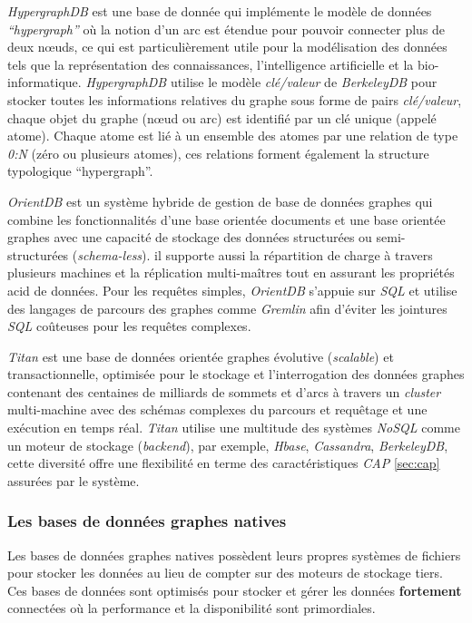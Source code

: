 \begin{itemize}
    \emph{HypergraphDB} \cite{hypergraphdb, iordanov2010hypergraphdb}
    est une base de donnée qui implémente le modèle de données
    \emph{``hypergraph''} où la notion d'un arc est étendue pour
    pouvoir connecter plus de deux nœuds, ce qui est particulièrement
    utile pour la modélisation des données tels que la représentation
    des connaissances, l'intelligence artificielle et la
    bio-informatique. \emph{HypergraphDB} utilise le modèle
    \textit{clé/valeur} de \emph{BerkeleyDB} \cite{berkeleydb} pour
    stocker toutes les informations relatives du graphe sous forme de
    pairs \textit{clé/valeur}, chaque objet du graphe (nœud ou arc)
    est identifié par un clé unique (appelé atome). Chaque atome est
    lié à un ensemble des atomes par une relation de type \emph{0:N}
    (zéro ou plusieurs atomes), ces relations forment également la
    structure typologique ``hypergraph''.

    \emph{OrientDB} \cite{orientdb} est un système hybride de gestion
    de base de données graphes qui combine les fonctionnalités d'une
    base orientée documents et une base orientée graphes avec une
    capacité de stockage des données structurées ou semi-structurées
    (\emph{schema-less}). il supporte aussi la répartition de charge à
    travers plusieurs machines et la réplication multi-maîtres tout en
    assurant les propriétés \acrshort{acid} de données. Pour les
    requêtes simples, \emph{OrientDB} s'appuie sur \emph{SQL} et
    utilise des langages de parcours des graphes comme \emph{Gremlin}
    afin d'éviter les jointures \emph{SQL} coûteuses pour les requêtes
    complexes.

    \emph{Titan} \cite{titan} est une base de données orientée graphes
    évolutive (\emph{scalable}) et transactionnelle, optimisée pour le
    stockage et l'interrogation des données graphes contenant des
    centaines de milliards de sommets et d'arcs à travers un
    \emph{cluster} multi-machine avec des schémas complexes du
    parcours et requêtage et une exécution en temps réal. \emph{Titan}
    utilise une multitude des systèmes \emph{NoSQL} comme un moteur de
    stockage (\emph{backend}), par exemple, \emph{Hbase},
    \emph{Cassandra}, \emph{BerkeleyDB}, cette diversité offre une
    flexibilité en terme des caractéristiques \emph{CAP} \ref{sec:cap}
    assurées par le système.

    \subsubsection{Les bases de données graphes natives}
    \label{sec:graphdb-native}
    Les bases de données graphes natives possèdent leurs propres
    systèmes de fichiers pour stocker les données au lieu de compter
    sur des moteurs de stockage tiers. Ces bases de données sont
    optimisés pour stocker et gérer les données \textbf{fortement}
    connectées où la performance et la disponibilité sont
    primordiales.


\end{itemize}
